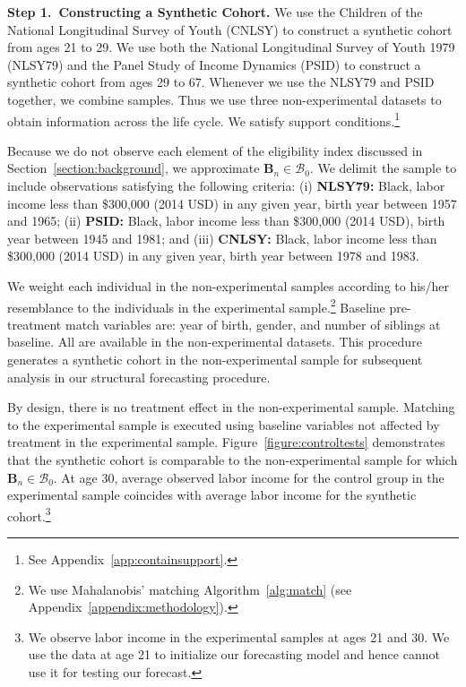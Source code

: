 \noindent \textbf{Step 1.\ Constructing a Synthetic Cohort.} We use the Children of the National Longitudinal Survey of Youth (CNLSY) to construct a synthetic cohort from ages 21 to 29. We use both the National Longitudinal Survey of Youth 1979 (NLSY79) and the Panel Study of Income Dynamics (PSID) to construct a synthetic cohort from ages 29 to 67. Whenever we use the NLSY79 and PSID together, we combine samples. Thus we use three non-experimental datasets to obtain information across the life cycle. We satisfy support conditions.\footnote{See Appendix~\ref{app:containsupport}.}

Because we do not observe each element of the eligibility index discussed in Section~\ref{section:background}, we approximate $\bm{B}_{n} \in \mathcal{B}_0$. We delimit the sample to include observations satisfying the following criteria: (i) \textbf{NLSY79:} Black, labor income less than \$300,000 (2014 USD) in any given year, birth year between 1957 and 1965; (ii) \textbf{PSID:} Black, labor income less than \$300,000 (2014 USD), birth year between 1945 and 1981; and (iii) \textbf{CNLSY:} Black, labor income less than \$300,000 (2014 USD) in any given year, birth year between 1978 and 1983.

We weight each individual in the non-experimental samples according to his/her resemblance to the individuals in the experimental sample.\footnote{We use Mahalanobis' matching Algorithm~\ref{alg:match} (see Appendix~\ref{appendix:methodology}).} Baseline pre-treatment match variables are: year of birth, gender, and number of siblings at baseline. All are available in the non-experimental datasets. This procedure generates a synthetic cohort in the non-experimental sample for subsequent analysis in our structural forecasting procedure.

By design, there is no treatment effect in the non-experimental sample. Matching to the experimental sample is executed using baseline variables not affected by treatment in the experimental sample. Figure~\ref{figure:controltests} demonstrates that the synthetic cohort is comparable to the non-experimental sample for which $\bm{B}_{n} \in \mathcal{B}_0$. At age 30, average observed labor income for the control group in the experimental sample coincides with average labor income for the synthetic cohort.\footnote{We observe labor income in the experimental samples at ages 21 and 30. We use the data at age 21 to initialize our forecasting model and hence cannot use it for testing our forecast.}


